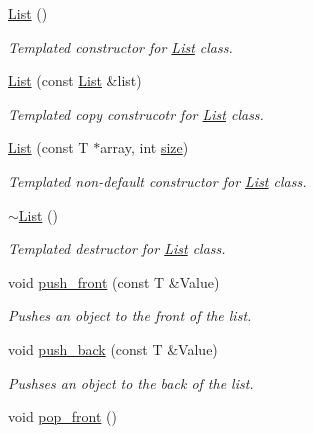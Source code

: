 \begin{DoxyCompactItemize}
\item 
\hypertarget{class_c_s170_1_1_list_a320f4140d33bc532545c9fea4c4125fd}{\hyperlink{class_c_s170_1_1_list_a320f4140d33bc532545c9fea4c4125fd}{List} ()}\label{class_c_s170_1_1_list_a320f4140d33bc532545c9fea4c4125fd}

\begin{DoxyCompactList}\small\item\em Templated constructor for \hyperlink{class_c_s170_1_1_list}{List} class. \end{DoxyCompactList}\item 
\hyperlink{class_c_s170_1_1_list_a1bf1d571284795381f5ce9681c0e3b31}{List} (const \hyperlink{class_c_s170_1_1_list}{List} \&list)
\begin{DoxyCompactList}\small\item\em Templated copy construcotr for \hyperlink{class_c_s170_1_1_list}{List} class. \end{DoxyCompactList}\item 
\hyperlink{class_c_s170_1_1_list_a44c17beed6649a2dc3860eaa4adcee58}{List} (const T $\ast$array, int \hyperlink{class_c_s170_1_1_list_a888f823e05765669c8e207a104eef36e}{size})
\begin{DoxyCompactList}\small\item\em Templated non-\/default constructor for \hyperlink{class_c_s170_1_1_list}{List} class. \end{DoxyCompactList}\item 
\hypertarget{class_c_s170_1_1_list_aafd84ac74f3354124a7aaa6158be96bf}{\hyperlink{class_c_s170_1_1_list_aafd84ac74f3354124a7aaa6158be96bf}{$\sim$\-List} ()}\label{class_c_s170_1_1_list_aafd84ac74f3354124a7aaa6158be96bf}

\begin{DoxyCompactList}\small\item\em Templated destructor for \hyperlink{class_c_s170_1_1_list}{List} class. \end{DoxyCompactList}\item 
void \hyperlink{class_c_s170_1_1_list_a237ad2fcb2214d61f72003ad50b74c98}{push\-\_\-front} (const T \&Value)
\begin{DoxyCompactList}\small\item\em Pushes an object to the front of the list. \end{DoxyCompactList}\item 
void \hyperlink{class_c_s170_1_1_list_a6f682cf4ca0a6b4f28fdd7ec8307ce7b}{push\-\_\-back} (const T \&Value)
\begin{DoxyCompactList}\small\item\em Pushses an object to the back of the list. \end{DoxyCompactList}\item 
\hypertarget{class_c_s170_1_1_list_a7fc65348f9263907a2c431a15c09acbf}{void \hyperlink{class_c_s170_1_1_list_a7fc65348f9263907a2c431a15c09acbf}{pop\-\_\-front} ()}\label{class_c_s170_1_1_list_a7fc65348f9263907a2c431a15c09acbf}


\end{DoxyCompactItemize}
